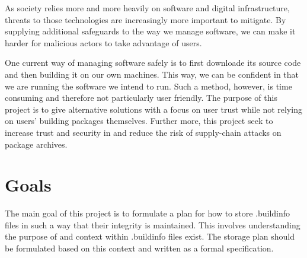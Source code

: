 \documentclass[english, biblatex, digitaloutput]{kththesis}
\begin{document}

As society relies more and more heavily on software and digital infrastructure, threats to those technologies are increasingly more important to mitigate. By supplying additional safeguards to the way we manage software, we can make it harder for malicious actors to take advantage of users.

One current way of managing software safely is to first downloade its source code and then building it on our own machines. This way, we can be confident in that we are running the software we intend to run. Such a method, however, is time consuming and therefore not particularly user friendly. The purpose of this project is to give alternative solutions with a focus on user trust while not relying on users' building packages themselves. Further more, this project seek to increase trust and security in  and reduce the risk of supply-chain attacks on package archives.


\section{Goals}

The main goal of this project is to formulate a plan for how to store .buildinfo files in such a way that their integrity is maintained. This involves understanding the purpose of and context within .buildinfo files exist. The storage plan should be formulated based on this context and written as a formal specification. 


\end{document}
